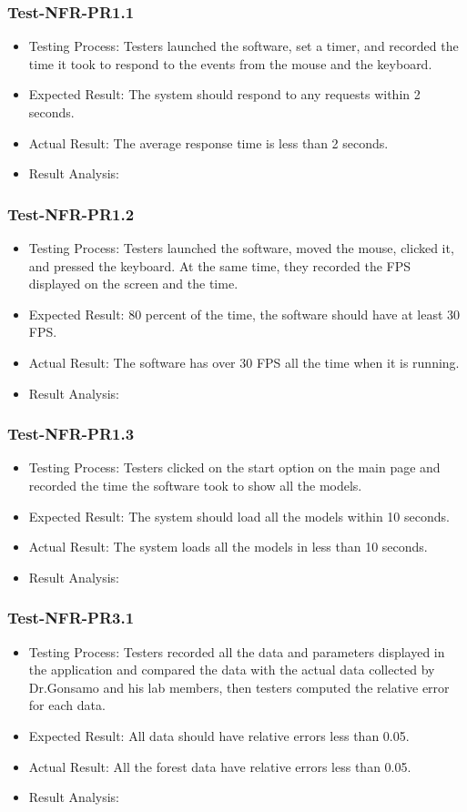 \documentclass[12pt, titlepage]{article}
\begin{document}
\subsubsection{Test-NFR-PR1.1}
\begin{itemize}
    \item Testing Process: Testers launched the software, set a timer, and recorded the time it took to respond to the events from the mouse and the keyboard.
    \item Expected Result: The system should respond to any requests within 2 seconds. 
    \item Actual Result: The average response time is less than 2 seconds.
    \item Result Analysis: \pass 
\end{itemize}
\subsubsection{Test-NFR-PR1.2}
\begin{itemize}
    \item Testing Process: Testers launched the software, moved the mouse, clicked it, and pressed the keyboard. At the same time, they recorded the FPS displayed on the screen and the time.
    \item Expected Result: 80 percent of the time, the software should have at least 30 FPS.
    \item Actual Result: The software has over 30 FPS all the time when it is running.
    \item Result Analysis: \pass 
\end{itemize}
\subsubsection{Test-NFR-PR1.3}
\begin{itemize}
    \item Testing Process: Testers clicked on the start option on the main page and recorded the time the software took to show all the models.
    \item Expected Result: The system should load all the models within 10 seconds.
    \item Actual Result: The system loads all the models in less than 10 seconds.
    \item Result Analysis: \pass
\end{itemize}
\subsubsection{Test-NFR-PR3.1}
\begin{itemize}
    \item Testing Process: Testers recorded all the data and parameters displayed in the application and compared the data with the actual data collected by Dr.Gonsamo and his lab members, then testers computed the relative error for each data.
    \item Expected Result: All data should have relative errors less than 0.05.
    \item Actual Result: All the forest data have relative errors less than 0.05.
    \item Result Analysis: \pass
\end{itemize}
\end{document}
